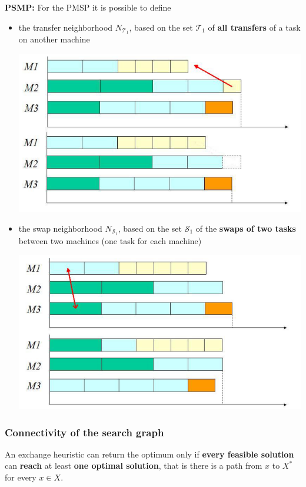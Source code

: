 \documentclass[11pt]{article}
\begin{document}
	\newpage
	
	\textbf{PSMP:} For the PMSP it is possible to define
	\begin{itemize}
		\item the transfer neighborhood $N_{\mathcal{T}_1}$, based on the set $\mathcal{T}_1$ of \textbf{all transfers} of a task on another machine
		\begin{center}
			\includegraphics[width=0.7\columnwidth]{img/PSMP1}
		\end{center}
		\nn
		
		\item the swap neighborhood $N_{\mathcal{S}_1}$, based on the set $\mathcal{S}_1$ of the \textbf{swaps of two tasks} between two machines (one task for each machine)
		\begin{center}
			\includegraphics[width=0.7\columnwidth]{img/PSMP2}
		\end{center}
		\nn
	\end{itemize}
	
	\newpage
	
	\subsubsection{Connectivity of the search graph}
	
	An exchange heuristic can return the optimum only if \textbf{every feasible solution} can \textbf{reach} at least \textbf{one optimal solution}, that is there is a path from $x$ to $X^\ast$ for every $x \in X$.\\
	
\end{document}
